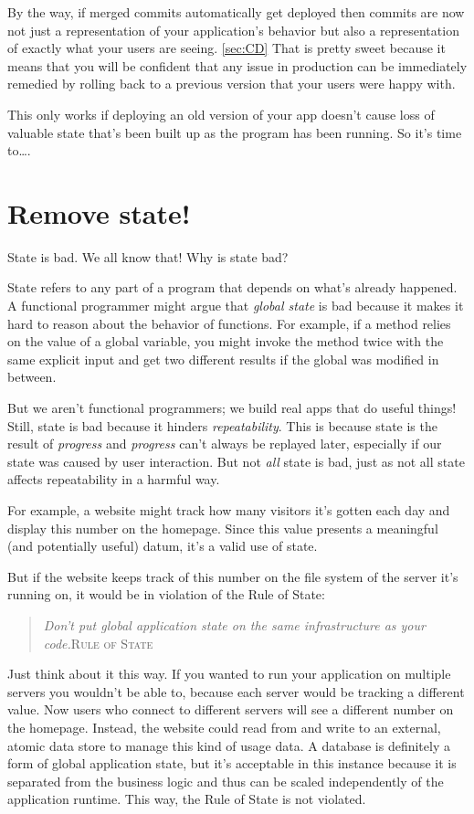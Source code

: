\documentclass{article}
\newcommand{\noterm}[1]{\textit{#1}}
\newcommand{\term}[1]{\noterm{#1}\index{#1}}
\newcommand{\newp}{\newline\indent}
\newcommand{\imp}[2]{
  \begin{quote}
    \textit{#2}\newp \textsc{#1}
  \end{quote}
}
\begin{document}
By the way, if merged commits automatically get deployed then commits are now not just a representation of your application's behavior but also a representation of exactly what your users are seeing. \ref{sec:CD}
That is pretty sweet because it means that you will be confident that any issue in production can be immediately remedied by rolling back to a previous version that your users were happy with.

This only works if deploying an old version of your app doesn't cause loss of valuable state that's been built up as the program has been running.
So it's time to\ldots.

\section{Remove state!}

State is bad.
We all know that!
Why is state bad?

State refers to any part of a program that depends on what's already happened.
A functional programmer might argue that \textit{global state} is bad because it makes it hard to reason about the behavior of functions.
For example, if a method relies on the value of a global variable, you might invoke the method twice with the same explicit input and get two different results if the global was modified in between.

But we aren't functional programmers; we build real apps that do useful things!
Still, state is bad because it hinders \term{repeatability}.
This is because state is the result of \term{progress} and \term{progress} can't always be replayed later, especially if our state was caused by user interaction.
But not \textit{all} state is bad, just as not all state affects repeatability in a harmful way.

For example, a website might track how many visitors it's gotten each day and display this number on the homepage.
Since this value presents a meaningful (and potentially useful) datum, it's a valid use of state.

But if the website keeps track of this number on the file system of the server it's running on, it would be in violation of the Rule of State:
\imp{Rule of State}{Don't put global application state on the same infrastructure as your code.}

Just think about it this way.
If you wanted to run your application on multiple servers you wouldn't be able to, because each server would be tracking a different value.
Now users who connect to different servers will see a different number on the homepage.
Instead, the website could read from and write to an external, atomic data store to manage this kind of usage data.
A database is definitely a form of global application state, but it's acceptable in this instance because it is separated from the business logic and thus can be scaled independently of the application runtime.
This way, the Rule of State is not violated.
\end{document}

